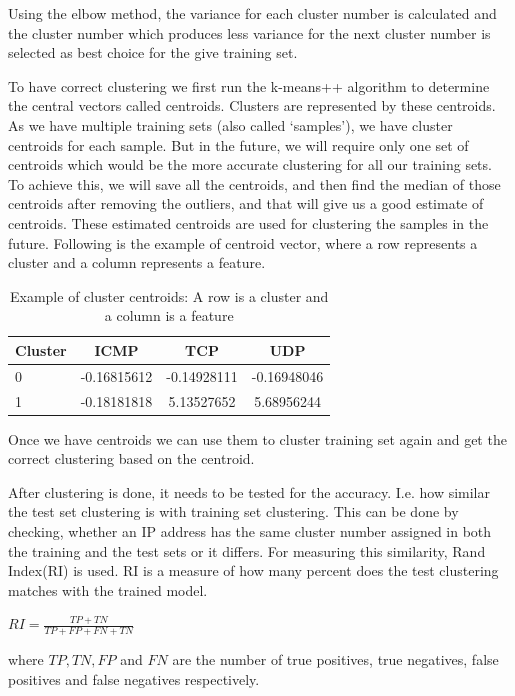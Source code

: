 \documentclass[12pt,oneside,a4paper]{article}
\begin{document}
Using the elbow method, the variance for each cluster number is calculated and the cluster number which produces less variance for the next cluster number is selected as best choice for the give training set.

To have correct clustering we first run the k-means++ algorithm to determine the central vectors called centroids. Clusters are represented by these centroids. As we have multiple training sets (also called `samples'), we have cluster centroids for each sample. But in the future, we will require only one set of centroids which would be the more accurate clustering for all our training sets. To achieve this, we will save all the centroids, and then find the median of those centroids after removing the outliers, and that will give us a good estimate of centroids. These estimated centroids are used for clustering the samples in the future. Following is the example of centroid vector, where a row represents a cluster and a column represents a feature.

\begin{table}[H]
\centering
  \begin{tabular}{ l | c  c  c }
    Cluster      & ICMP  & TCP  & UDP \\
    \hline
    0         &{-0.16815612}       &{-0.14928111}    &{-0.16948046} \\
    1         &{-0.18181818}       &{5.13527652}     &{5.68956244} \\
  \end{tabular}
\caption{Example of cluster centroids: A row is a cluster and a column is a feature} \label{table:centroids-example}
\end{table}

Once we have centroids we can use them to cluster training set again and get the correct clustering based on the centroid.

After clustering is done, it needs to be tested for the accuracy. I.e. how similar the test set clustering is with training set clustering. This can be done by checking, whether an IP address has the same cluster number assigned in both the training and the test sets or it differs. For measuring this similarity, Rand Index(RI)\cite{ri-index} is used. RI is a measure of how many percent does the test clustering matches with the trained model.

\hspace{4cm} $RI={\frac {TP+TN}{TP+FP+FN+TN}}$

where $TP, TN, FP$ and $FN$ are the number of true positives, true negatives, false positives and false negatives respectively.
\end{document}
